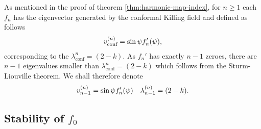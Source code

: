 As mentioned in the proof of theorem \ref{thm:harmonic-map-index}, for
$n\ge1$ each $f_n$ has the eigenvector generated by the conformal
Killing field and defined as follows
\begin{align}
  \label{eq:50}
  \vn{\text{conf}}{n}=\sin\psi f_n'(\psi),
\end{align}
corresponding to the $\lambda_{\text{conf}}^n=(2-k)$. As $f_n'$ has
exactly $n-1$ zeroes, there are $n-1$ eigenvalues smaller than
$\lambda_{\text{conf}}^n=(2-k)$ which follows from the Sturm-Liouville
theorem. We shall therefore denote
\begin{align}
  \label{eq:51}
  \vn{n-1}{n}=\sin\psi f_n'(\psi)\quad
  \lb{n}{n-1}=(2-k).
\end{align}

\subsection{Stability of $f_0$}
\label{sec:stability-f_0}

